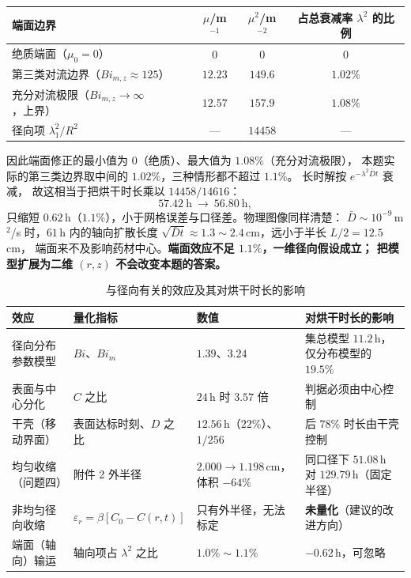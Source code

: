 \documentclass[12pt,a4paper,fontset=none]{ctexart}
\begin{document}
\begin{center}
\small
\begin{tabular}{lccc}
  \toprule
  端面边界 & $\mu$/m$^{-1}$ & $\mu^2$/m$^{-2}$
    & 占总衰减率 $\lambda^2$ 的比例 \\
  \midrule
  绝质端面（$\mu_0=0$） & $0$ & $0$ & $0$ \\
  第三类对流边界（$Bi_{m,z}\approx125$） & $12.23$ & $149.6$ & $1.02\%$ \\
  充分对流极限（$Bi_{m,z}\to\infty$，上界） & $12.57$ & $157.9$ & $1.08\%$ \\
  径向项 $\lambda_1^2/R^2$ & --- & $14458$ & --- \\
  \bottomrule
\end{tabular}
\end{center}

因此端面修正的最小值为 $0$（绝质）、最大值为 $1.08\%$（充分对流极限），
本题实际的第三类边界取中间的 $1.02\%$，三种情形都不超过 $1.1\%$。
长时解按 $e^{-\lambda^2\bar Dt}$ 衰减，
故这相当于把烘干时长乘以 $14458/14616$：
\[
  57.42\ \text{h}\ \longrightarrow\ 56.80\ \text{h},
\]
只缩短 $0.62$\,h（$1.1\%$），小于网格误差与口径差。物理图像同样清楚：
$\bar D\sim10^{-9}$\,m$^2$/s 时，$61$\,h 内的轴向扩散长度
$\sqrt{\bar Dt}\approx1.3\sim2.4$\,cm，远小于半长 $L/2=12.5$\,cm，
端面来不及影响药材中心。\textbf{端面效应不足 $1.1\%$，一维径向假设成立；
把模型扩展为二维 $(r,z)$ 不会改变本题的答案。}

\begin{table}[htbp]
  \centering
  \caption{与径向有关的效应及其对烘干时长的影响}
  \label{tab:radial}
  \small
  \begin{tabular}{p{2.5cm}p{3.1cm}p{3.9cm}p{4.1cm}}
    \toprule
    效应 & 量化指标 & 数值 & 对烘干时长的影响 \\
    \midrule
    径向分布参数模型 & $Bi$、$Bi_m$
      & $1.39$、$3.24$ & 集总模型 $11.2$\,h，仅分布模型的 $19.5\%$ \\
    表面与中心分化 & $C$ 之比
      & $24$\,h 时 $3.57$ 倍 & 判据必须由中心控制 \\
    干壳（移动界面） & 表面达标时刻、$D$ 之比
      & $12.56$\,h（$22\%$）、$1/256$ & 后 $78\%$ 时长由干壳控制 \\
    均匀收缩（问题四） & 附件 2 外半径
      & $2.000\to1.198$\,cm，体积 $-64\%$
       & 同口径下 $51.08$\,h 对 $129.79$\,h（固定半径） \\
    非均匀径向收缩 & $\varepsilon_r=\beta\left[C_0-C(r,t)\right]$
      & 只有外半径，无法标定 & \textbf{未量化}（建议的改进方向） \\
    端面（轴向）输运 & 轴向项占 $\lambda^2$ 之比
      & $1.0\%\sim1.1\%$ & $-0.62$\,h，可忽略 \\
    \bottomrule
  \end{tabular}
\end{table}
\end{document}
